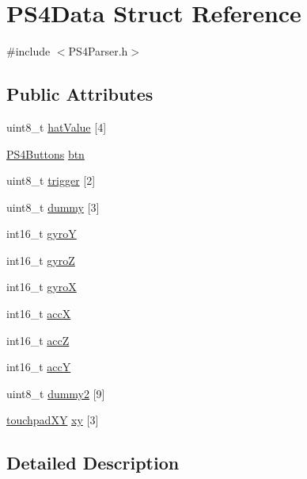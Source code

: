 \hypertarget{struct_p_s4_data}{\section{\-P\-S4\-Data \-Struct \-Reference}
\label{struct_p_s4_data}
}


{\ttfamily \#include $<$\-P\-S4\-Parser.\-h$>$}

\subsection*{\-Public \-Attributes}
\begin{DoxyCompactItemize}
\item 
uint8\-\_\-t \hyperlink{struct_p_s4_data_aa004cc456c79269dec99a9eed667484d}{hat\-Value} \mbox{[}4\mbox{]}
\item 
\hyperlink{union_p_s4_buttons}{\-P\-S4\-Buttons} \hyperlink{struct_p_s4_data_a60c0217c1879e1b16ae5d19a8c8695a3}{btn}
\item 
uint8\-\_\-t \hyperlink{struct_p_s4_data_aad2133de0113cee402cda4a8c7e8b6a5}{trigger} \mbox{[}2\mbox{]}
\item 
uint8\-\_\-t \hyperlink{struct_p_s4_data_aef57cffc87f423db996d817ea75fe5f9}{dummy} \mbox{[}3\mbox{]}
\item 
int16\-\_\-t \hyperlink{struct_p_s4_data_a2c7c9d0313863ab69e7cafdd79b7492c}{gyro\-Y}
\item 
int16\-\_\-t \hyperlink{struct_p_s4_data_ace15cafba1570d56951e7db7947ba94c}{gyro\-Z}
\item 
int16\-\_\-t \hyperlink{struct_p_s4_data_a0535a4a38dc250250fbf253e6bea53dc}{gyro\-X}
\item 
int16\-\_\-t \hyperlink{struct_p_s4_data_a7e4ebbf1e22d59d3d7126bd1d56ee9b4}{acc\-X}
\item 
int16\-\_\-t \hyperlink{struct_p_s4_data_a635a4a50b43400707baa74c8e87944ca}{acc\-Z}
\item 
int16\-\_\-t \hyperlink{struct_p_s4_data_a8cbe113c7f536bd0c47704d957a97d54}{acc\-Y}
\item 
uint8\-\_\-t \hyperlink{struct_p_s4_data_ae084b9b30d75bf86aa29b7c537297e55}{dummy2} \mbox{[}9\mbox{]}
\item 
\hyperlink{structtouchpad_x_y}{touchpad\-X\-Y} \hyperlink{struct_p_s4_data_a1cfd90d32bbd9233dae34fb148fc9f56}{xy} \mbox{[}3\mbox{]}
\end{DoxyCompactItemize}


\subsection{\-Detailed \-Description}


